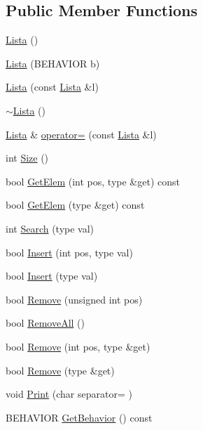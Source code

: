 \subsection*{Public Member Functions}
\begin{DoxyCompactItemize}
\item 
\hyperlink{classLista_af076a7c1dfedf5ac8ecb36964deca783}{Lista} ()
\item 
\hyperlink{classLista_a6453f7b9f27540814659787229d7bafc}{Lista} (B\+E\+H\+A\+V\+I\+O\+R b)
\item 
\hyperlink{classLista_ab1603c5fc93d55d5c70521bde0a45865}{Lista} (const \hyperlink{classLista}{Lista} \&l)
\item 
\hyperlink{classLista_a3fce7b3e78f9d20ca3e48f94fd221f25}{$\sim$\+Lista} ()
\item 
\hyperlink{classLista}{Lista} \& \hyperlink{classLista_ae1cc9720e5ec77d3919bb67242f91e85}{operator=} (const \hyperlink{classLista}{Lista} \&l)
\item 
int \hyperlink{classLista_a070deaea71f21839e20b8b07cd703a97}{Size} ()
\item 
bool \hyperlink{classLista_af127e2ac077a9e606622bfed0942db69}{Get\+Elem} (int pos, type \&get) const 
\item 
bool \hyperlink{classLista_a7f07cde0e5462dd947f359837460c5ca}{Get\+Elem} (type \&get) const 
\item 
int \hyperlink{classLista_a234b80661798a6f9001cacd309e1339d}{Search} (type val)
\item 
bool \hyperlink{classLista_a8797e9cf12a4f4e650d96f0059419090}{Insert} (int pos, type val)
\item 
bool \hyperlink{classLista_a2487cb1d29b4f62d1b98b420ca27c423}{Insert} (type val)
\item 
bool \hyperlink{classLista_aca38246307d3554aac78db4910465490}{Remove} (unsigned int pos)
\item 
bool \hyperlink{classLista_a2ad4af918b7dcf9dac12f8fc883459cf}{Remove\+All} ()
\item 
bool \hyperlink{classLista_afd4996cee3271a4efff2020b90eaf8c5}{Remove} (int pos, type \&get)
\item 
bool \hyperlink{classLista_a82c77b506683f0d7ea6a1148f4cdcd1a}{Remove} (type \&get)
\item 
void \hyperlink{classLista_a6994e358359f08c5f771edafbab8afa3}{Print} (char separator= \textquotesingle{} \textquotesingle{})
\item 
B\+E\+H\+A\+V\+I\+O\+R \hyperlink{classLista_a8ec31b5ab14a3337cc38d26ea06c1bc9}{Get\+Behavior} () const 
\end{DoxyCompactItemize}
